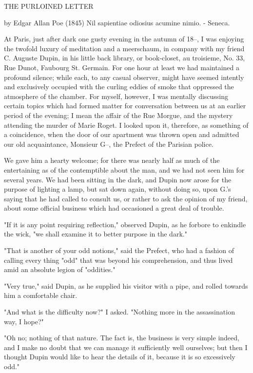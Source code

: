 \documentclass{article}
\begin{document}
\tiny

THE PURLOINED LETTER

by Edgar Allan Poe 
(1845)
Nil sapientiae odiosius acumine nimio. - Seneca.

At Paris, just after dark one gusty evening in the autumn of 18--, I was enjoying the twofold luxury of meditation and a meerschaum, in company with my friend C. Auguste Dupin, in his little back library, or book-closet, au troisieme, No. 33, Rue Dunot, Faubourg St. Germain. For one hour at least we had maintained a profound silence; while each, to any casual observer, might have seemed intently and exclusively occupied with the curling eddies of smoke that oppressed the atmosphere of the chamber. For myself, however, I was mentally discussing certain topics which had formed matter for conversation between us at an earlier period of the evening; I mean the affair of the Rue Morgue, and the mystery attending the murder of Marie Roget. I looked upon it, therefore, as something of a coincidence, when the door of our apartment was thrown open and admitted our old acquaintance, Monsieur G--, the Prefect of the Parisian police.

We gave him a hearty welcome; for there was nearly half as much of the entertaining as of the contemptible about the man, and we had not seen him for several years. We had been sitting in the dark, and Dupin now arose for the purpose of lighting a lamp, but sat down again, without doing so, upon G.'s saying that he had called to consult us, or rather to ask the opinion of my friend, about some official business which had occasioned a great deal of trouble.

"If it is any point requiring reflection," observed Dupin, as he forbore to enkindle the wick, "we shall examine it to better purpose in the dark."

"That is another of your odd notions," said the Prefect, who had a fashion of calling every thing "odd" that was beyond his comprehension, and thus lived amid an absolute legion of "oddities."

"Very true," said Dupin, as he supplied his visitor with a pipe, and rolled towards him a comfortable chair.

"And what is the difficulty now?" I asked. "Nothing more in the assassination way, I hope?"

"Oh no; nothing of that nature. The fact is, the business is very simple indeed, and I make no doubt that we can manage it sufficiently well ourselves; but then I thought Dupin would like to hear the details of it, because it is so excessively odd."
\end{document}

